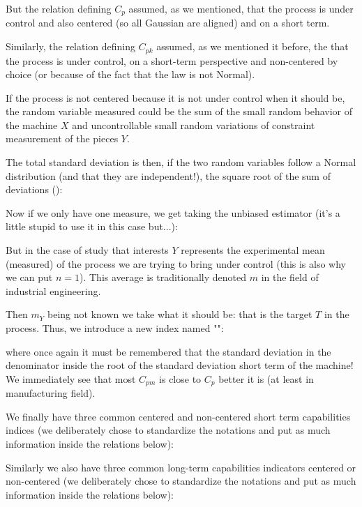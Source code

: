 	But the relation defining $C_p$ assumed, as we mentioned, that the process is under control and also centered (so all Gaussian are aligned) and on a short term.
	
	Similarly, the relation defining $C_{pk}$ assumed, as we mentioned it before, the that the process is under control, on a short-term perspective and non-centered by choice (or because of the fact that the law is not Normal).
	
	If the process is not centered because it is not under control when it should be, the random variable measured could be the sum of the small random behavior of the machine $X$ and uncontrollable small random variations of constraint measurement of the pieces $Y$.
	
	The total standard deviation is then, if the two random variables follow a Normal distribution (and that they are independent!), the square root of the sum of deviations ():
	
	Now if we only have one measure, we get taking the unbiased estimator (it's a little stupid to use it in this case but...):
	
	But in the case of study that interests $Y$ represents the experimental mean (measured) of the process we are trying to bring under control (this is also why we can put $n=1$). This average is traditionally denoted $m$ in the field of industrial engineering.
	
	Then $m_Y$ being not known we take what it should be: that is the target $T$ in the process. Thus, we introduce a new index named "":
	
	where once again it must be remembered that the standard deviation in the denominator inside the root of the standard deviation short term of the machine!
	We immediately see that most $C_{pm}$ is close to $C_{p}$ better it is (at least in manufacturing field).
	
	We finally have three common centered and non-centered short term capabilities indices (we deliberately chose to standardize the notations and put as much information inside the relations below):
	
	Similarly we also have three common long-term capabilities indicators centered or non-centered (we deliberately chose to standardize the notations and put as much information inside the relations below):
	
